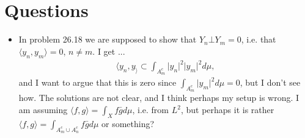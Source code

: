 \section*{Questions}
\begin{itemize}
    \item In problem 26.18 we are supposed to show that \(Y_n\bot Y_m = 0\), i.e. that \(\langle y_n, y_m\rangle =0\), \(n\neq m\).
    I get ... 
    \begin{align*}
        \langle y_n,y_\rangle \subset\int_{A^{c}_{m}}\vert y_n \vert^2 \vert y_m\vert^2d\mu,
    \end{align*}
    and I want to argue that this is zero since \(\int_{A^{c}_{m}}\vert y_m\vert^2d\mu = 0\), but I don't see how. The solutions are not clear, and I think
    perhaps my setup is wrong. I am assuming \(\langle f,g\rangle = \int_X f\bar{g}d\mu\), i.e. from \(L^2\), but perhaps it is rather 
    \(\langle f,g\rangle = \int_{A^{c}_{m}\cup A^{c}_{n}} f\bar{g}d\mu\) or something?
\end{itemize}